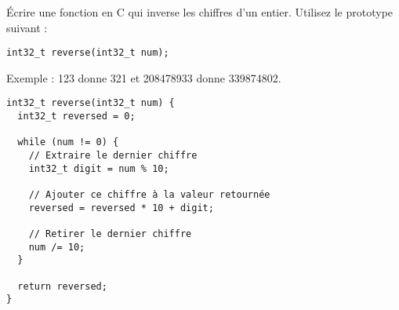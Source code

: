 \documentclass[french,a4paper,addpoints,11pt]{exam}
\begin{document}
\begin{questions}

\question Écrire une fonction en C qui inverse les chiffres d'un entier. Utilisez le prototype suivant :

\begin{lstlisting}
int32_t reverse(int32_t num);
\end{lstlisting}

Exemple : 123 donne 321 et 208478933 donne 339874802.

\ifprintanswers
\begin{solution}
\begin{lstlisting}
int32_t reverse(int32_t num) {
  int32_t reversed = 0;

  while (num != 0) {
    // Extraire le dernier chiffre
    int32_t digit = num % 10;

    // Ajouter ce chiffre à la valeur retournée
    reversed = reversed * 10 + digit;

    // Retirer le dernier chiffre
    num /= 10;
  }

  return reversed;
}
\end{lstlisting}
\end{solution}
\else
\fillwithdottedlines{10cm}
\fi

\end{questions}
\end{document}
